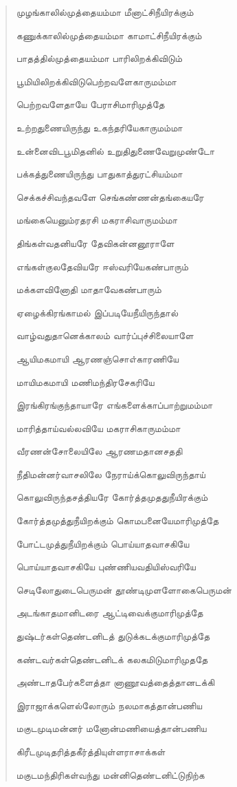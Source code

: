 \documentclass{article}
\begin{document}
\begin{quotation}
{முழங்காலில்முத்தையம்மா மீனாட்சிநீயிரக்கும்

கணுக்காலில்முத்தையம்மா காமாட்சிநீயிரக்கும்

பாதத்தில்முத்தையம்மா பாரிலிறக்கிவிடும்

பூமியிலிறக்கிவிடுபெற்றவளேகாருமம்மா

பெற்றவளேதாயே பேராசிமாரிமுத்தே

உற்றதுணையிருந்து உகந்தரியேகாருமம்மா

உன்னைவிடபூமிதனில் உறுதிதுணைவேறுமுண்டோ

பக்கத்துணையிருந்து பாதுகாத்துரட்சியம்மா

செக்கச்சிவந்தவளே செங்கண்ணன்தங்கையரே

மங்கையெனும்ரதரசி மகராசிவாருமம்மா

திங்கள்வதனியரே தேவிகன்னனூராளே

எங்கள்குலதேவியரே ஈஸ்வரியேகண்பாரும்

மக்களவினோதி மாதாவேகண்பாரும்

ஏழைக்கிரங்காமல் இப்படியேநீயிருந்தால்

வாழ்வதுதானெக்காலம் வார்ப்புச்சிலையாளே

ஆயிமகமாயி ஆரணஞ்சொஎ்காரணியே

மாயிமகமாயி மணிமந்திரசேகரியே

இரங்கிரங்குந்தாயாரே எங்களைக்காப்பாற்றுமம்மா

மாரித்தாய்வல்லவியே மகராசிகாருமம்மா

வீரணன்சோலையிலே ஆரணமதானசததி

நீதிமன்னர்வாசலிலே நேராய்க்கொலுவிருந்தாய்

கொலுவிருந்தசத்தியரே கோர்த்தமுததுநீயிரக்கும்

கோர்த்தமுத்துநீயிறக்கும் கொமபனையேமாரிமுத்தே

போட்டமுத்துநீயிறக்கும் பொய்யாதவாசகியே

பொய்யாதவாசகியே புண்ணியவதியிஸ்வரியே

செடிலோதுடைபெருமன் தூண்டிமுளளோகைபெருமன்

அடங்காதமானிடரை ஆட்டிவைக்குமாரிமுத்தே

துஷ்டர்கள்தெண்டனிடத் துடுக்கடக்குமாரிமுத்தே

கண்டவர்கள்தெண்டனிடக் கலகமிடுமாரிமுததே

அண்டாதபேர்களைத்தா னாணூவத்தைத்தானடக்கி

இராஜாக்களெல்லோரும் நலமாகத்தான்பணிய

மகுடமுடிமன்னர் மனோன்மணியைத்தான்பணிய

கிரீடமுடிதரித்தகீர்த்தியுள்ளராசாக்கள்

மகுடமந்திரிகள்வந்து மன்னிதெண்டனிட்டுநிற்க

}
\end{quotation}
\end{document}
